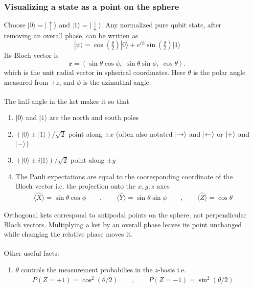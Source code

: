 \documentclass[11pt, answers]{exam}
\theoremstyle{definition}
\theoremstyle{bulleted}
\begin{document}
	\subsubsection{Visualizing a state as a point on the sphere}
	Choose \(|0\rangle=|\uparrow\rangle\) and \(|1\rangle=|\downarrow\rangle\). Any normalized pure qubit state, after removing an overall phase, can be written as
	\[
	|\psi\rangle=\cos\left(\tfrac{\theta}{2}\right)|0\rangle
	+e^{i\phi}\sin\left(\tfrac{\theta}{2}\right)|1\rangle
	\]Its Bloch vector is
	\[
	{\mathbf r=(\sin\theta\cos\phi,\;\sin\theta\sin\phi,\;\cos\theta).}
	\]
	which is the unit radial vector in spherical coordinates. Here \(\theta\) is the polar angle measured from \(+z\), and \(\phi\) is the azimuthal angle. \\ \\
	The half-angle in the ket makes it so that
	\begin{enumerate}[label=(\roman*)]
		\item \(|0\rangle\) and \(|1\rangle\) are the north and south poles
		\item \((|0\rangle\pm|1\rangle)/\sqrt2\) point along \(\pm x\) (often also notated $\ket{\rightarrow}$ and $\ket{\leftarrow}$ or $\ket{+}$ and $\ket{-}$)
		\item \((|0\rangle\pm i|1\rangle)/\sqrt2\) point along \(\pm y\)
		\item The Pauli expectations are equal to the cooresponding coordinate of the Bloch vector i.e. the projection onto the $x,y,z$ axes
		\begin{align*}
			\langle \hat{X}\rangle=\sin\theta\cos\phi\qquad,\qquad\langle \hat{Y}\rangle = \sin\theta\sin\phi\qquad,\qquad\langle \hat{Z}\rangle=\cos\theta
		\end{align*}
	\end{enumerate}
	Orthogonal kets correspond to antipodal points on the sphere, not perpendicular Bloch vectors. Multiplying a ket by an overall phase leaves its point unchanged while changing the relative phase moves it. \\ \\
	Other useful facts:
	\begin{enumerate}[label=(\roman*)]
		\item $\theta$ controls the measurement probabilies in the $z$-basis i.e.
		\begin{align*}
			P(Z=+1)=\cos^2(\theta/2)\qquad,\qquad P(Z=-1)=\sin^2(\theta/2)
		\end{align*}
	\end{enumerate}
	
\end{document}
